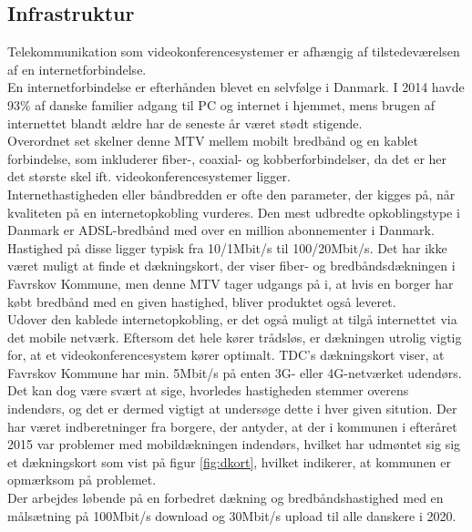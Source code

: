 \subsection{Infrastruktur}
Telekommunikation som videokonferencesystemer er afhængig af tilstedeværelsen af en  internetforbindelse.\\
En internetforbindelse er efterhånden blevet en selvfølge i Danmark. I 2014 havde 93\% af danske familier adgang til PC og internet i hjemmet, mens brugen af internettet blandt ældre har de seneste år været stødt stigende\cite{itanvendelse2014}.
\\Overordnet set skelner denne MTV mellem mobilt bredbånd og en kablet forbindelse, som inkluderer fiber-, coaxial- og kobberforbindelser, da det er her det største skel ift. videokonferencesystemer ligger.\\
Internethastigheden eller båndbredden er ofte den parameter, der kigges på, når kvaliteten på en internetopkobling vurderes. Den mest udbredte opkoblingstype i Danmark er ADSL-bredbånd med over en million abonnementer i Danmark\cite{statadsl}. Hastighed på disse ligger typisk fra 10/1Mbit/s til 100/20Mbit/s\cite{tdchastigheder}\cite{telenorhastigheder}. Det har ikke været muligt at finde et dækningskort, der viser fiber- og bredbåndsdækningen i Favrskov Kommune, men denne MTV tager udgangs på i, at hvis en borger har købt bredbånd med en given hastighed, bliver produktet også leveret.\\
Udover den kablede internetopkobling, er det også muligt at tilgå internettet via det mobile netværk. Eftersom det hele kører trådsløs, er dækningen utrolig vigtig for, at et videokonferencesystem kører optimalt. TDC's dækningskort viser, at Favrskov Kommune har min. 5Mbit/s på enten 3G- eller 4G-netværket udendørs\cite{tdcdaekning}. Det kan dog være svært at sige, hvorledes hastigheden stemmer overens indendørs, og det er dermed vigtigt at undersøge dette i hver given sitution. Der har været indberetninger fra borgere, der antyder, at der i kommunen i efteråret 2015 var problemer med mobildækningen indendørs\cite{tv2oj_daekning}, hvilket har udmøntet sig sig et dækningskort som vist på figur \ref{fig:dkort}, hvilket indikerer, at kommunen er opmærksom på problemet.\\
Der arbejdes løbende på en forbedret dækning og bredbåndshastighed med en målsætning på 100Mbit/s download og 30Mbit/s upload til alle danskere i 2020\cite{digitalvel}.
